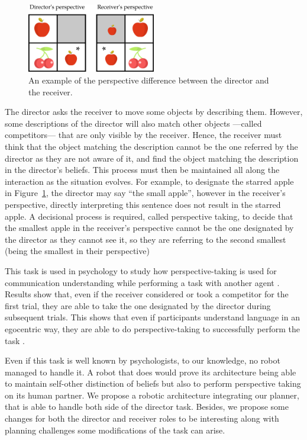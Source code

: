\documentclass[a4paper,11pt,twoside]{StyleThese}
\begin{document}
\begin{figure}[hbtp]
\centering
\includegraphics[width=0.5\textwidth]{figures/chapter5/dt_apple.png}
\caption{An example of the perspective difference between the director and the receiver.}
\label{fig:chap5dtapple}
\end{figure}

The director asks the receiver to move some objects by describing them. However, some descriptions of the director will also match other objects ---called competitors--- that are only visible by the receiver. Hence, the receiver must think that the object matching the description cannot be the one referred by the director as they are not aware of it, and find the object matching the description in the director's beliefs. This process must then be maintained all along the interaction as the situation evolves. For example, to designate the starred apple in Figure~\ref{fig:chap5dtapple}, the director may say ``the small apple'', however in the receiver's perspective, directly interpreting this sentence does not result in the starred apple. A decisional process is required, called perspective taking, to decide that the smallest apple in the receiver's perspective cannot be the one designated by the director as they cannot see it, so they are referring to the second smallest (being the smallest in their perspective)

This task is used in psychology to study how perspective-taking is used for communication understanding while performing a task with another agent \cite{keysar2000taking}. Results show that, even if the receiver considered or took a competitor for the first trial, they are able to take the one designated by the director during subsequent trials. This shows that even if participants understand language in an egocentric way, they are able to do perspective-taking to successfully perform the task \cite{keysar2003limits}. 

Even if this task is well known by psychologists, to our knowledge, no robot managed to handle it. A robot that does would prove its architecture being able to maintain self-other distinction of beliefs but also to perform perspective taking on its human partner. We propose a robotic architecture integrating our planner, that is able to handle both side of the director task. Besides, we propose some changes for both the director and receiver roles to be interesting along with planning challenges some modifications of the task can arise.
\end{document}
